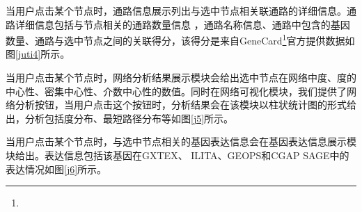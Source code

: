 当用户点击某个节点时，通路信息展示列出与选中节点相关联通路的详细信息。通路详细信息包括与节点相关的通路数量信息
，通路名称信息、通路中包含的基因数量、通路与选中节点之间的关联得分，该得分是来自GeneCard\footnote{}官方提供数据如图\ref{juti4}所示。

当用户点击某个节点时，网络分析结果展示模块会给出选中节点在网络中度、度的中心性、密集中心性、介数中心性的数值。同时在网络可视化模块，我们提供了网络分析按钮，当用户点击这个按钮时，分析结果会在该模块以柱状统计图的形式给出，分析包括度分布、最短路径分布等如图\ref{j5}所示。

当用户点击某个节点时，与选中节点相关的基因表达信息会在基因表达信息展示模块给出。表达信息包括该基因在GXTEX\cite{}、 ILITA\cite{}、GEOPS\cite{}和CGAP SAGE\cite{}中的表达情况如图\ref{j6}所示。

\begin{figure}[h]{\label{juti}}
  \centering
  \begin{minipage}{1.0\linewidth}
    \setlength{\subfigcapskip}{-1bp}
    \centering
    \begin{minipage}{\textwidth}
      \centering
      \subfigure{\label{juti1}}\addtocounter{subfigure}{-2}
      \subfigure{\label{juti2}}\addtocounter{subfigure}{-2}
      \subfigure{\label{juti3}}\addtocounter{subfigure}{-2}

\end{minipage}
\end{minipage}
\end{figure}
